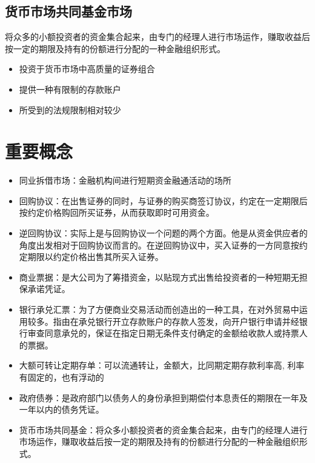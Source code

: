 \documentclass{article}
\begin{document}
\subsection*{货币市场共同基金市场}
将众多的小额投资者的资金集合起来，由专门的经理人进行市场运作，赚取收益后按一定的期限及持有的份额进行分配的一种金融组织形式。
\begin{itemize}
    \item 投资于货币市场中高质量的证券组合
    \item 提供一种有限制的存款账户
    \item 所受到的法规限制相对较少
\end{itemize}
\section*{\center 重要概念}
\begin{tcolorbox}
    \begin{spacing}{0.9}
        \begin{itemize}
            \item 同业拆借市场：金融机构间进行短期资金融通活动的场所
            \item 回购协议：在出售证券的同时，与证券的购买商签订协议，约定在一定期限后按约定价格购回所买证券，从而获取即时可用资金。
            \item 逆回购协议：实际上是与回购协议一个问题的两个方面。他是从资金供应者的角度出发相对于回购协议而言的。在逆回购协议中，买入证券的一方同意按约定期限以约定价格出售其所买入证券。
            \item 商业票据：是大公司为了筹措资金，以贴现方式出售给投资者的一种短期无担保承诺凭证。
            \item 银行承兑汇票：为了方便商业交易活动而创造出的一种工具，在对外贸易中运用较多。指由在承兑银行开立存款账户的存款人签发，向开户银行申请并经银行审查同意承兑的，保证在指定日期无条件支付确定的金额给收款人或持票人的票据。
            \item 大额可转让定期存单：可以流通转让，金额大，比同期定期存款利率高, 利率有固定的，也有浮动的
            \item 政府债券：是政府部门以债务人的身份承担到期偿付本息责任的期限在一年及一年以内的债务凭证。
            \item 货币市场共同基金：将众多小额投资者的资金集合起来，由专门的经理人进行市场运作，赚取收益后按一定的期限及持有的份额进行分配的一种金融组织形式。
        \end{itemize}
        \end{spacing}
\end{tcolorbox}
\end{document}

